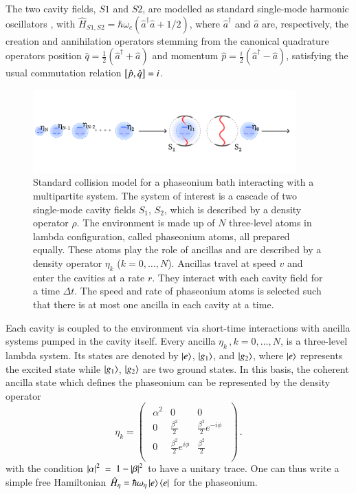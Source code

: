 \documentclass[entropy,article,submit,pdftex,moreauthors]{Definitions/mdpi}
\renewcommand{\a}{\hat{a}}
\newcommand{\ad}{\hat{a}^\dagger}
\begin{document}
The two cavity fields, $S1$ and $S2$, are modelled as standard single-mode harmonic oscillators \cite{BreuerPetruccione}, with $\hat{H}_{S1,S2}=\hbar\omega_c\left(\ad\a+1/2\right)$, where $\ad$ and $\a$ are, respectively, the creation and annihilation operators stemming from the canonical quadrature operators position $\hat q=\frac{1}{2}(\ad+\a)$ and momentum $\hat p=\frac{i}{2}(\ad-\a)$, satisfying the usual commutation relation $\comm{\hat p}{\hat q} = i$.
\begin{figure}
\includegraphics[width=0.9\textwidth]{images/phaseonium_horizontal.pdf}
\caption{ Standard collision model for a phaseonium bath interacting with a multipartite system. The system of interest is a cascade of two single-mode cavity fields $S_1$, $S_2$, which is described by a density operator $\rho$. The environment is made up of $N$ three-level atoms in lambda configuration, called phaseonium atoms, all prepared equally. These atoms play the role of ancillas and are described by a density operator $\eta_k$ ($k=0,\ldots, N$). Ancillas travel at speed $v$ and enter the cavities at a rate $r$. They interact with each cavity field for a time $\Delta t$. The speed and rate of phaseonium atoms is selected such that there is at most one ancilla in each cavity at a time.}
\label{fig:cascade-setup}
\end{figure}

Each cavity is coupled to the environment via short-time interactions with ancilla systems pumped in the cavity itself. 
Every ancilla $\eta_k\,,k=0,\ldots,N$, is a three-level lambda system. Its states are denoted by $\ket{e}$, $\ket{g_1}$, and $\ket{g_2}$, where $\ket{e}$ represents the excited state while $\ket{g_1}$, $\ket{g_2}$ are two ground states. 
In this basis, the coherent ancilla state which defines the phaseonium \cite{SCULLY1997} can be represented by the density operator
\begin{equation}
\label{def:ancilla-state}
    \eta_k = 
\begin{pmatrix}
\begin{array}{ccc}
    \alpha^2 & 0 & 0
\\
    0 & \frac{\beta^2}{2} & \frac{\beta^2}{2} e^{-i \phi} 
\\[.3em]
    0 & \frac{\beta^2}{2}  e^{i \phi } & \frac{\beta^2}{2} \\
\end{array}
\end{pmatrix}
\,.\end{equation}
with the condition $\abs{\alpha}^2~=~1-\abs{\beta}^2$ to have a unitary trace.
One can thus write a simple free Hamiltonian $\hat{H}_\eta = \hbar\omega_\eta\ket{e}\bra{e}$ for the phaseonium.
\end{document}
